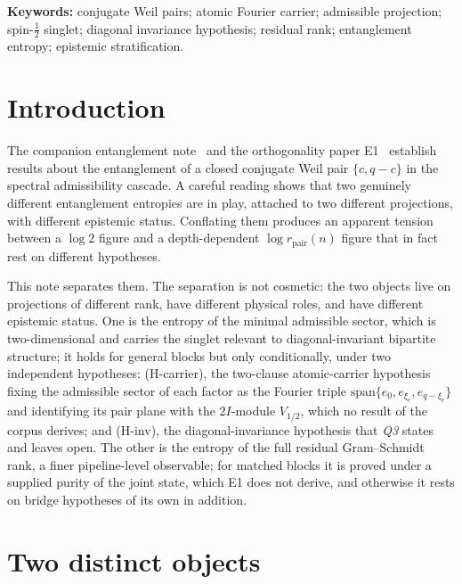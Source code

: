 \documentclass[11pt]{article}
\newcommand{\rpair}{r_{\mathrm{pair}}}
\begin{document}
  \noindent\textbf{Keywords:}
  conjugate Weil pairs;
  atomic Fourier carrier;
  admissible projection;
  spin-$\tfrac12$ singlet;
  diagonal invariance hypothesis;
  residual rank;
  entanglement entropy;
  epistemic stratification.

  \newpage
  \tableofcontents

  \newpage

  \section{Introduction}
    \label{sec:intro}

    The companion entanglement note~\cite{Beau2026entnote} and the orthogonality paper
    E1~\cite{Beau2026ent1} establish results about the entanglement of a closed conjugate Weil
    pair $\{c,q-c\}$ in the spectral admissibility cascade.
    A careful reading shows that two genuinely different entanglement entropies are in play,
    attached to two different projections, with different epistemic status.
    Conflating them produces an apparent tension between a $\log 2$ figure and a depth-dependent
    $\log\rpair(n)$ figure that in fact rest on different hypotheses.

    This note separates them.
    The separation is not cosmetic: the two objects live on projections of different rank,
    have different physical roles, and have different epistemic status.
    One is the entropy of the minimal admissible sector, which is two-dimensional and carries
    the singlet relevant to diagonal-invariant bipartite structure; it holds for general blocks
    but only conditionally, under two independent hypotheses: (H-carrier), the two-clause
    atomic-carrier hypothesis fixing the admissible sector of each factor as the Fourier triple
    $\mathrm{span}\{e_0,e_{\xi_c},e_{q-\xi_c}\}$ and identifying its pair plane with the
    $2I$-module $V_{1/2}$, which no result of the corpus derives; and
    (H-inv), the diagonal-invariance hypothesis that \emph{Q3} states and leaves open.
    The other is the entropy of the full residual Gram--Schmidt rank, a finer pipeline-level
    observable; for matched blocks it is proved under a supplied purity of the joint state, which
    E1 does not derive, and otherwise it rests on bridge hypotheses of its own in addition.

  \section{Two distinct objects}
    \label{sec:objects}
\end{document}
